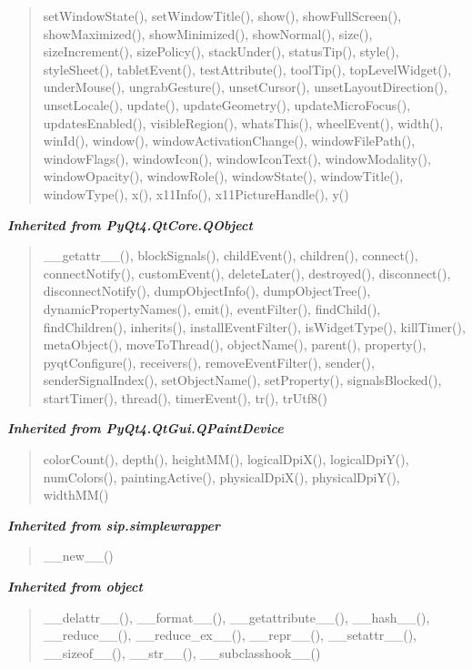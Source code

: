 \begin{quote}
setWindowState(), setWindowTitle(), show(), showFullScreen(), showMaximized(), showMinimized(), showNormal(), size(), sizeIncrement(), sizePolicy(), stackUnder(), statusTip(), style(), styleSheet(), tabletEvent(), testAttribute(), toolTip(), topLevelWidget(), underMouse(), ungrabGesture(), unsetCursor(), unsetLayoutDirection(), unsetLocale(), update(), updateGeometry(), updateMicroFocus(), updatesEnabled(), visibleRegion(), whatsThis(), wheelEvent(), width(), winId(), window(), windowActivationChange(), windowFilePath(), windowFlags(), windowIcon(), windowIconText(), windowModality(), windowOpacity(), windowRole(), windowState(), windowTitle(), windowType(), x(), x11Info(), x11PictureHandle(), y()
\end{quote}

\large{\textbf{\textit{Inherited from PyQt4.QtCore.QObject}}}

\begin{quote}
\_\_getattr\_\_(), blockSignals(), childEvent(), children(), connect(), connectNotify(), customEvent(), deleteLater(), destroyed(), disconnect(), disconnectNotify(), dumpObjectInfo(), dumpObjectTree(), dynamicPropertyNames(), emit(), eventFilter(), findChild(), findChildren(), inherits(), installEventFilter(), isWidgetType(), killTimer(), metaObject(), moveToThread(), objectName(), parent(), property(), pyqtConfigure(), receivers(), removeEventFilter(), sender(), senderSignalIndex(), setObjectName(), setProperty(), signalsBlocked(), startTimer(), thread(), timerEvent(), tr(), trUtf8()
\end{quote}

\large{\textbf{\textit{Inherited from PyQt4.QtGui.QPaintDevice}}}

\begin{quote}
colorCount(), depth(), heightMM(), logicalDpiX(), logicalDpiY(), numColors(), paintingActive(), physicalDpiX(), physicalDpiY(), widthMM()
\end{quote}

\large{\textbf{\textit{Inherited from sip.simplewrapper}}}

\begin{quote}
\_\_new\_\_()
\end{quote}

\large{\textbf{\textit{Inherited from object}}}

\begin{quote}
\_\_delattr\_\_(), \_\_format\_\_(), \_\_getattribute\_\_(), \_\_hash\_\_(), \_\_reduce\_\_(), \_\_reduce\_ex\_\_(), \_\_repr\_\_(), \_\_setattr\_\_(), \_\_sizeof\_\_(), \_\_str\_\_(), \_\_subclasshook\_\_()
\end{quote}

